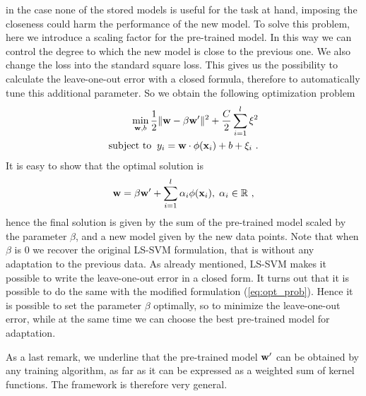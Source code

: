 in the case none of the stored models is useful for the task at hand,
imposing the closeness could harm the performance of the new model.
To solve this problem, here we introduce a scaling factor for
the pre-trained model. In this way we can control the degree to which
the new model is close to the previous one.
We also change the loss into the standard square loss. This
gives us the possibility to calculate the leave-one-out error with a
closed formula, therefore
to automatically tune this additional parameter. So we obtain the
following optimization problem
\begin{align} 
  \min_{\mathbf{w},b} \frac{1}{2} \|\mathbf{w}- \beta \mathbf{w}'\|^2 + \frac{C}{2} \sum_{i=1}^l \xi^2 \nonumber \\
  \mbox{subject to} \;\; y_i = \mathbf{w} \cdot \phi(\mathbf{x}_i) + b + \xi_i~.
  \label{eq:opt_prob}
\end{align}
It is easy to show that the optimal solution is %
\begin{equation}
  \mathbf{w} = \beta \mathbf{w}' + \sum_{i=1}^l \alpha_i \phi(\mathbf{x}_i), \; \alpha_i \in \mathbb{R}~,
\end{equation}
\noindent hence the final solution is given by the sum of the pre-trained model
scaled by the parameter $\beta$, and a new model given by the new data
points.  Note that when $\beta$ is $0$ we recover the original LS-SVM
formulation, that is without any adaptation to the previous data.  As
already mentioned, LS-SVM makes it possible to write the leave-one-out
error in a closed form. It turns out that it is possible to do the
same with the modified formulation (\ref{eq:opt_prob}). Hence it is
possible to set the parameter $\beta$ optimally, so to minimize the
leave-one-out error,
while at the same time we can choose the best pre-trained model for
adaptation.

As a last remark, we underline that the pre-trained model $\mathbf{w}'$ can be
obtained by any training algorithm, as far as it can be expressed as a
weighted sum of kernel functions.  The framework is therefore very
general.
